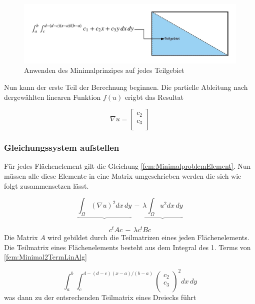 \begin{figure}[h!]
	\centering
	\includegraphics[scale=0.8]{papers/fem/Images/FoTeilgebiet.jpeg}
	\caption{Anwenden des Minimalprinzipes auf jedes Teilgebiet}
	\label{fig:schemNMR_vorlage}
\end{figure}

Nun kann der erste Teil der Berechnung beginnen. Die partielle Ableitung nach dergewählten linearen Funktion $f(u)$ erigbt das Resultat

\begin{equation}
	\nabla u = 	
	\left[ \begin{array}{r}
	c_2  \\
	c_3 \\
	\end{array}\right]
	\label{fem:equationSchwarzquadratischP}
\end{equation} 

\subsubsection{Gleichungssystem aufstellen }

Für jedes Flächenelement gilt die Gleichung \ref{fem:MinimalproblemElement}. Nun müssen alle diese Elemente in eine Matrix umgeschrieben werden die sich wie folgt zusammensetzen lässt.

\begin{equation}
			\underbrace{ \int_{\Omega} (\nabla u)^2 dx \, dy} \, -  \, \underbrace{\lambda \int_{\Omega} u^2 dx \,dy}
			\label{fem:Minimal2TermLinAlg}
\end{equation}


\begin{equation}
			c^t Ac \, - \, \lambda c^t Bc
			\label{fem:Minimal2LinAlg}
\end{equation}
Die Matrix $A$ wird gebildet durch die Teilmatrizen eines jeden Flächenelements. Die Teilmatrix eines Flächenelements besteht  aus dem Integral des 1. Terms von \ref{fem:Minimal2TermLinAlg} 

\begin{equation}
			\int_a^b \int_c^{d-(d-c)(x-a)/(b-a)} \left( \begin{array}{c} c_2 \\ c_3\\	
\end{array} \right)^2 dx \, dy
			\label{fem:Minimal2LinAlgA}
\end{equation}
was dann zu der entsrechenden Teilmatrix eines Dreiecks führt

